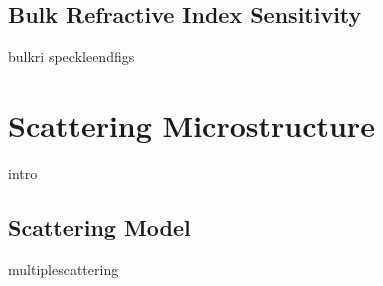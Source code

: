 \documentclass[12pt,a4paper,titlepage,onecolumn]{report}
\begin{document}
\section{Bulk Refractive Index Sensitivity}\label{sec:bulkri}
{bulkri}
\newpage
{speckleendfigs}

\chapter{Scattering Microstructure}\label{ch:scatteringmicro}
{intro}
\section{Scattering Model}
{multiplescattering}
\end{document}
